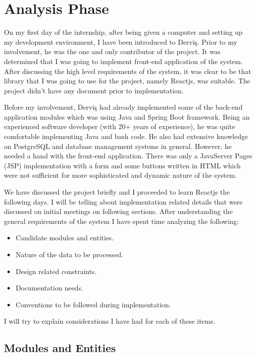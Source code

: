 \section{Analysis Phase}
On my first day of the internship, after being given a computer and setting up 
my development environment, I have been introduced to Derviş. Prior to my 
involvement, he was the one and only contributor of the project. It was 
determined that I was going to implement front-end application of the system. 
After discussing the high level requirements of the system, it was clear to be 
that library that I was going to use for the project, namely Reactjs, was 
suitable. The project didn't have any document prior to implementation.
\par
Before my involvement, Derviş had already implemented some of the back-end 
application modules which was using Java and Spring Boot framework. Being an 
experienced software developer (with 20+ years of experience), he was quite 
comfortable implementing Java and bash code. He also had extensive knowledge 
on PostgreSQL and database management systems in general. However, he needed 
a hand with the front-end application. There was only a JavaServer Pages (JSP) 
implementation with a form and some buttons written in HTML which were not 
sufficient for more sophisticated and dynamic nature of the system.
\par
We have discussed the project briefly and I proceeded to learn Reactjs the 
following days. I will be telling about implementation related details that 
were discussed on initial meetings on following sections. After understanding 
the general requirements of the system I have spent time analyzing the 
following:
\begin{itemize}
    \item Candidate modules and entities.
    \item Nature of the data to be processed.
    \item Design related constraints.
    \item Documentation needs.
    \item Conventions to be followed during implementation.
\end{itemize}

I will try to explain considerations I have had for each of these items. 

\subsection{Modules and Entities}

